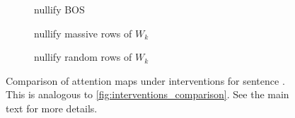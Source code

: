 \documentclass[11pt]{article}
\newif\ifYRMcomments
\newcommand{\YRM}[1]{\ifYRMcomments\textcolor{red}{[YRM: #1]}\fi}
\begin{document}
\begin{figure}[t!]
   \begin{subfigure}[t]{0.22\textwidth}
     \centering
     \caption{nullify BOS}
     \label{fig:more_intervention4_s1}
   \end{subfigure}\hspace{\bottomseptwo}
   \begin{subfigure}[t]{0.22\textwidth}
     \centering
     \caption{nullify massive rows of $W_k$}
     \label{fig:more_intervention5_s1}
   \end{subfigure}\hspace{\bottomseptwo}
   \begin{subfigure}[t]{0.22\textwidth}
     \centering
     \caption{nullify random rows of $W_k$}
     \label{fig:more_intervention5_2_s1}
   \end{subfigure}
   \caption{Comparison of attention maps under interventions for sentence \YRM{add sentence number 1 here}. This is analogous to \cref{fig:interventions_comparison}. See the main text for more details.}
   \label{fig:more_interventions_s1}
 \end{figure}
\clearpage
\end{document}
